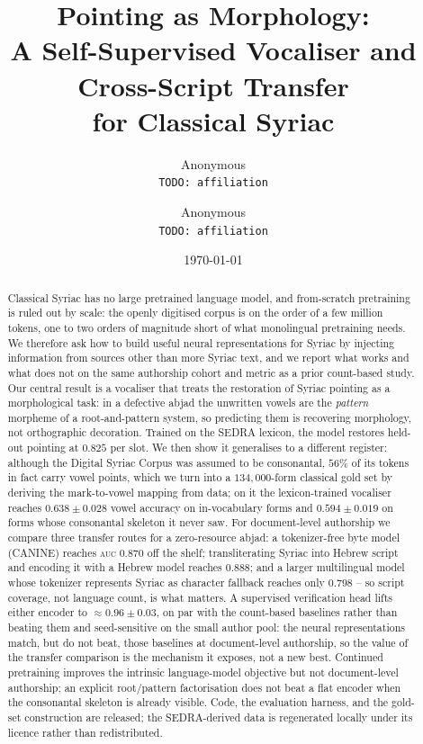 \documentclass[11pt]{article}
\title{Pointing as Morphology:\\
A Self-Supervised Vocaliser and Cross-Script Transfer\\
for Classical Syriac}
\author{Anonymous\\ \texttt{TODO: affiliation} \and Anonymous\\ \texttt{TODO: affiliation}}
\date{\today}
\newcommand{\auc}{\textsc{auc}}
\begin{document}
\maketitle

\begin{abstract}
Classical Syriac has no large pretrained language model, and from-scratch
pretraining is ruled out by scale: the openly digitised corpus is on the order of
a few million tokens, one to two orders of magnitude short of what monolingual
pretraining needs. We therefore ask how to build useful neural representations for
Syriac by injecting information from sources other than more Syriac text, and we
report what works and what does not on the same authorship cohort and metric as a
prior count-based study. Our central result is a vocaliser that treats the
restoration of Syriac pointing as a morphological task: in a defective abjad the
unwritten vowels are the \emph{pattern} morpheme of a root-and-pattern system, so
predicting them is recovering morphology, not orthographic decoration. Trained on
the SEDRA lexicon, the model restores held-out pointing at $0.825$ per slot. We
then show it generalises to a different register: although the Digital Syriac
Corpus was assumed to be consonantal, $56\%$ of its tokens in fact carry vowel
points, which we turn into a $134{,}000$-form classical gold set by deriving the
mark-to-vowel mapping from data; on it the lexicon-trained vocaliser reaches
$0.638\pm0.028$ vowel accuracy on in-vocabulary forms and $0.594\pm0.019$ on forms
whose consonantal skeleton it never saw. For document-level authorship we compare
three transfer routes for a zero-resource abjad: a tokenizer-free byte model
(CANINE) reaches \auc{} $0.870$ off the shelf; transliterating Syriac into Hebrew
script and encoding it with a Hebrew model reaches $0.888$; and a larger
multilingual model whose tokenizer represents Syriac as character fallback reaches
only $0.798$ -- so script coverage, not language count, is what matters. A
supervised verification head lifts either encoder to $\approx 0.96\pm0.03$, on par
with the count-based baselines rather than beating them and seed-sensitive on the
small author pool: the neural representations match, but do not beat, those
baselines at document-level authorship, so the value of the transfer comparison is
the mechanism it exposes, not a new best.
Continued pretraining improves the intrinsic language-model objective but not
document-level authorship; an explicit root/pattern factorisation does not beat a
flat encoder when the consonantal skeleton is already visible. Code, the
evaluation harness, and the gold-set construction are released; the SEDRA-derived
data is regenerated locally under its licence rather than redistributed.
\end{abstract}
\end{document}
